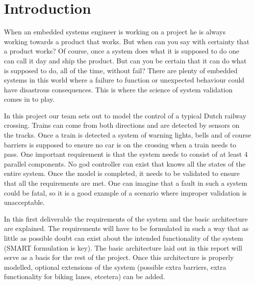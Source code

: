 \documentclass[final]{report}
\begin{document}
\chapter{Introduction}
When an embedded systems engineer is working on a project he is always working towards a product that works.
But when can you say with certainty that a product works? Of course, once a system does what it is supposed to do one can call it day and ship the product.
But can you be certain that it can do what is supposed to do, all of the time, without fail? There are plenty of embedded systems in this world where a failure to function or unexpected behaviour could have disastrous consequences.
This is where the science of system validation comes in to play.

In this project our team sets out to model the control of a typical Dutch railway crossing.
Trains can come from both directions and are detected by sensors on the tracks.
Once a train is detected a system of warning lights, bells and of course barriers is supposed to ensure no car is on the crossing when a train needs to pass.
One important requirement is that the system needs to consist of at least 4 parallel components.
No god controller can exist that knows all the states of the entire system.
Once the model is completed, it needs to be validated to ensure that all the requirements are met.
One can imagine that a fault in such a system could be fatal, so it is a good example of a scenario where improper validation is unacceptable.

In this first deliverable the requirements of the system and the basic architecture are explained.
The requirements will have to be formulated in such a way that as little as possible doubt can exist about the intended functionality of the system (SMART formulation is key).
The basic architecture laid out in this report will serve as a basis for the rest of the project.
Once this architecture is properly modelled, optional extensions of the system (possible extra barriers, extra functionality for biking lanes, etcetera) can be added.
\end{document}
